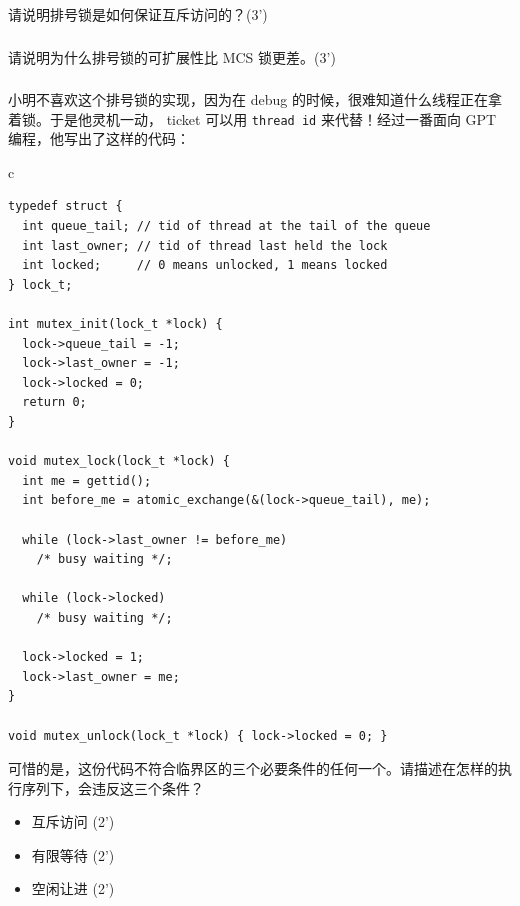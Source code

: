 \documentclass[a4paper,12pt]{article}
\newcommand{\score}[1]{(#1')}
\begin{document}
请说明排号锁是如何保证互斥访问的？\score{3}

\begin{answer}
  \lipsum[3]
\end{answer}

\subsubsection{}

请说明为什么排号锁的可扩展性比 MCS 锁更差。\score{3}

\begin{answer}
  \lipsum[3]
\end{answer}

\subsubsection{}

小明不喜欢这个排号锁的实现，因为在 debug 的时候，很难知道什么线程正在拿着锁。于是他灵机一动， ticket 可以用 \verb|thread id| 来代替！经过一番面向 GPT 编程，他写出了这样的代码：

\begin{table}[htb]
  \centering
  \begin{tabular}{c}
    \begin{lstlisting}
typedef struct {
  int queue_tail; // tid of thread at the tail of the queue
  int last_owner; // tid of thread last held the lock
  int locked;     // 0 means unlocked, 1 means locked
} lock_t;

int mutex_init(lock_t *lock) {
  lock->queue_tail = -1;
  lock->last_owner = -1;
  lock->locked = 0;
  return 0;
}

void mutex_lock(lock_t *lock) {
  int me = gettid();
  int before_me = atomic_exchange(&(lock->queue_tail), me);

  while (lock->last_owner != before_me)
    /* busy waiting */;

  while (lock->locked)
    /* busy waiting */;

  lock->locked = 1;
  lock->last_owner = me;
}

void mutex_unlock(lock_t *lock) { lock->locked = 0; }
    \end{lstlisting}
  \end{tabular}
\end{table}

可惜的是，这份代码不符合临界区的三个必要条件的任何一个。请描述在怎样的执行序列下，会违反这三个条件？

\begin{itemize}
  \item 互斥访问 \score{2}
  \item 有限等待 \score{2}
  \item 空闲让进 \score{2}
\end{itemize}
\end{document}
